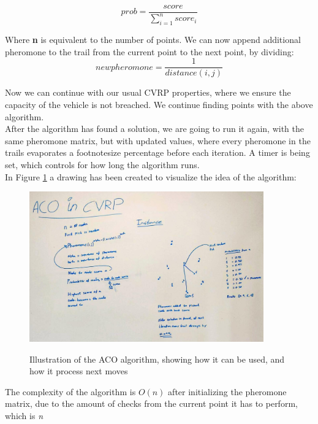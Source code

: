 \documentclass[12pt]{article}
\begin{document}
\begin{equation}
prob = \frac{score}{\displaystyle\sum_{i=1}^{n} score_i}
\end{equation}

Where \textbf{n} is equivalent to the number of points. We can now append additional pheromone to the trail from the current point to the next point, 
by dividing: 
\begin{equation}
    newpheromone = \frac{1}{distance(i, j)}
\end{equation}

Now we can continue with our usual CVRP properties, where we ensure the capacity of the vehicle is not breached. We continue finding points with the above 
algorithm. \\
After the algorithm has found a solution, we are going to run it again, with the same pheromone matrix, but with updated values, where every pheromone in the trails evaporates a footnotesize percentage before each iteration. 
 A timer is being set, which controls for how long the algorithm runs. \\
In Figure \ref{fig:acowhiteboard} a drawing has been created to visualize the idea of the algorithm: \\

\begin{figure}[h]
	\caption{Illustration of the ACO algorithm, showing how it can be used, and how it process next moves}
	\centering
	\includegraphics[width=0.9\textwidth]{ACO_Whiteboard.jpg}
	\label{fig:acowhiteboard}
\end{figure}

The complexity of the algorithm is $O(n)$ after initializing the pheromone matrix, due to the amount of checks from the current point 
it has to perform, which is \textit{n}
\end{document}
